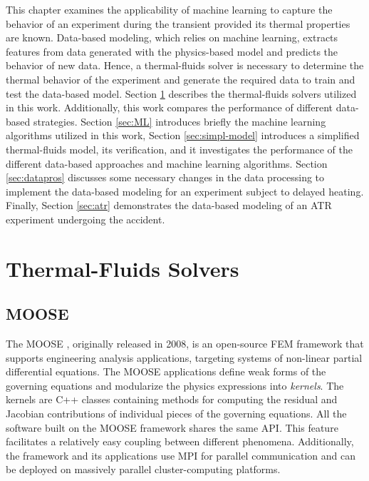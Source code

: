 \label{ch:tf}

This chapter examines the applicability of machine learning to capture the behavior of an experiment during the transient provided its thermal properties are known.
Data-based modeling, which relies on machine learning, extracts features from data generated with the physics-based model and predicts the behavior of new data.
Hence, a thermal-fluids solver is necessary to determine the thermal behavior of the experiment and generate the required data to train and test the data-based model.
Section \ref{sec:tf} describes the thermal-fluids solvers utilized in this work.
Additionally, this work compares the performance of different data-based strategies.
Section \ref{sec:ML} introduces briefly the machine learning algorithms utilized in this work, Section \ref{sec:simpl-model} introduces a simplified thermal-fluids model, its verification, and it investigates the performance of the different data-based approaches and machine learning algorithms.
Section \ref{sec:datapros} discusses some necessary changes in the data processing to implement the data-based modeling for an experiment subject to delayed heating.
Finally, Section \ref{sec:atr} demonstrates the data-based modeling of an ATR experiment undergoing the accident.


\section{Thermal-Fluids Solvers}
\label{sec:tf}

\subsection{MOOSE}

The \gls*{MOOSE} \cite{gaston_moose_2009}, originally released in 2008, is an open-source \gls*{FEM} framework that supports engineering analysis applications, targeting systems of non-linear partial differential equations.
The MOOSE applications define weak forms of the governing equations and modularize the physics expressions into \textit{kernels}.
The kernels are C++ classes containing methods for computing the residual and Jacobian contributions of individual pieces of the governing equations.
All the software built on the MOOSE framework shares the same \gls*{API}.
This feature facilitates a relatively easy coupling between different phenomena.
Additionally, the framework and its applications use \gls*{MPI} for parallel communication and can be deployed on massively parallel cluster-computing platforms.

